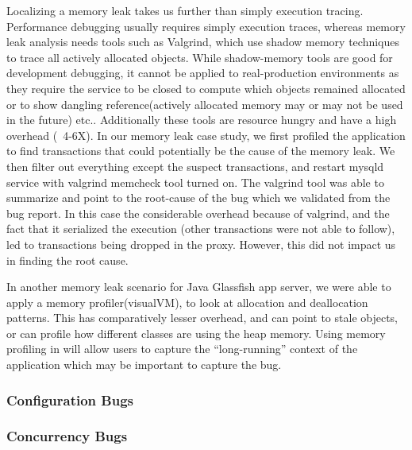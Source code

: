 Localizing a memory leak takes us further than simply execution tracing. 
Performance debugging usually requires simply execution traces, whereas memory leak analysis needs tools such as Valgrind\cite{valgrind}, which use shadow memory techniques to trace all actively allocated objects.
While shadow-memory tools are good for development debugging, it cannot be applied to real-production environments as they require the service to be closed to compute which objects remained allocated or to show dangling reference(actively allocated memory may or may not be used in the future) etc.. Additionally these tools are resource hungry and have a high overhead (~4-6X).
In our memory leak case study, we first profiled the application to find transactions that could potentially be the cause of the memory leak. 
We then filter out everything except the suspect transactions, and restart mysqld service with valgrind memcheck tool turned on.
The valgrind tool was able to summarize and point to the root-cause of the bug which we validated from the bug report.
In this case the considerable overhead because of valgrind, and the fact that it serialized the execution (other transactions were not able to follow), led to transactions being dropped in the proxy. However, this did not impact us in finding the root cause.

In another memory leak scenario for Java Glassfish\cite{glassfish} app server, we were able to apply a memory profiler(visualVM), to look at allocation and deallocation patterns.
This has comparatively lesser overhead, and can point to stale objects, or can profile how different classes are using the heap memory.
Using memory profiling in \parikshan will allow users to capture the ``long-running'' context of the application which may be important to capture the bug.

\subsubsection{Configuration Bugs}
\label{sec:configurationBugs}



\subsubsection{Concurrency Bugs}
\label{sec:concurrencyBugs}

